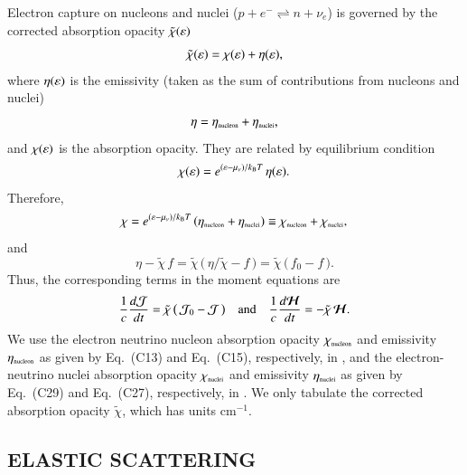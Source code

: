 \documentclass[11pt,letterpaper,twoside,english,final]{article}
\begin{document}
Electron capture on nucleons and nuclei ($p+e^{-}\rightleftharpoons n+\nu_{e}$) is governed by the corrected absorption opacity $\tilde{\chi}(\varepsilon)$ 
\begin{equation}
  \tilde{\chi}(\varepsilon) = \chi(\varepsilon) + \eta(\varepsilon), 
\end{equation}
where $\eta(\varepsilon)$ is the emissivity (taken as the sum of contributions from nucleons and nuclei)
\begin{equation}
  \eta = \eta_{\mbox{\tiny nucleon}} + \eta_{\mbox{\tiny nuclei}},
\end{equation}
and $ \chi(\varepsilon)$ is the absorption opacity.  
They are related by equilibrium condition
\begin{equation}
  \chi(\varepsilon) = e^{(\varepsilon-\mu_{\nu})/k_{\mbox{\tiny B}}T}\,\eta(\varepsilon). 
\end{equation}
Therefore,
\begin{equation}
  \chi = e^{(\varepsilon-\mu_{\nu})/k_{\mbox{\tiny B}}T}\,(\eta_{\mbox{\tiny nucleon}} + \eta_{\mbox{\tiny nuclei}}) 
  \equiv \chi_{\mbox{\tiny nucleon}} + \chi_{\mbox{\tiny nuclei}},
\end{equation}
and
\begin{equation}
  \eta-\tilde{\chi}\,f=\tilde{\chi}\,\big(\,\eta/\tilde{\chi}-f\,\big)=\tilde{\chi}\,\big(\,f_{0}-f\,\big).  
\end{equation}
Thus, the corresponding terms in the moment equations are
\begin{equation}
  \frac{1}{c}\frac{d \mathcal{J}}{d t}=\tilde{\chi}\,\big(\,\mathcal{J}_{0}-\mathcal{J}\,\big)
  \quad\text{and}\quad
  \frac{1}{c}\frac{d \boldsymbol{\mathcal{H}}}{d t}=-\tilde{\chi}\,\boldsymbol{\mathcal{H}}.  
\end{equation}
We use the electron neutrino nucleon absorption opacity $\chi_{\mbox{\tiny nucleon}}$ and emissivity $\eta_{\mbox{\tiny nucleon}}$ as given by Eq.~(C13) and Eq.~(C15), respectively, in \citet{bruenn_1985}, and the electron-neutrino nuclei absorption opacity $\chi_{\mbox{\tiny nuclei}}$ and emissivity $\eta_{\mbox{\tiny nuclei}}$ as given by Eq.~(C29) and Eq.~(C27), respectively, in \citet{bruenn_1985}.  
We only tabulate the corrected absorption opacity $\tilde{\chi}$, which has units cm$^{-1}$.  

\subsection{ELASTIC SCATTERING}
\label{sec:elasticScattering}
\end{document}
